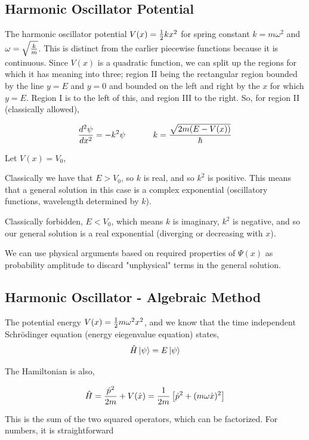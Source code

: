 \documentclass[english, 11pt]{article}
\begin{document}
    \subsection{Harmonic Oscillator Potential}

      The harmonic oscillator potential $V(x) = \frac{1}{2}kx^2$ for spring constant $k = m\omega^2$ and $\omega = \sqrt{\frac{k}{m}}$. This is distinct from the earlier piecewise functions because it is continuous. Since $V(x)$ is a quadratic function, we can split up the regions for which it has meaning into three; region II being the rectangular region bounded by the line $y = E$ and $y = 0$ and bounded on the left and right by the $x$ for which $y = E$. Region I is to the left of this, and region III to the right. So, for region II (classically allowed),

      \[ \f{d^2\psi}{dx^2} = -k^2\psi \ \ \ \ \ \ \ \ \ \ k = \f{\sqrt{2m(E-V(x))}}{\hbar} \]

      Let $V(x) = V_0$,\newline

      Classically we have that $E > V_0$, so $k$ is real, and so $k^2$ is positive. This means that a general solution in this case is a complex exponential (oscillatory functions, wavelength determined by $k$).
      \newline

      Classically forbidden, $E<V_0$, which means $k$ is imaginary, $k^2$ is negative, and so our general solution is a real exponential (diverging or decreasing with $x$).\newline

      We can use physical arguments based on required properties of $\Psi(x)$ as probability amplitude to discard "unphysical" terms in the general solution.

    \subsection{Harmonic Oscillator - Algebraic Method}

      The potential energy $V(x) = \frac{1}{2}m \omega^2 x^2$, and we know that the time independent Schrödinger equation (energy eiegenvalue equation) states,
      \[ \hat{H}\left|\psi\right\rangle = E\left|\psi\right\rangle \]

      The Hamiltonian is also,

      \[ \hat{H} = \frac{\hat{p}^2}{2m} + V(\hat{x}) = \frac{1}{2m} \left[ \hat{p}^2 + (m \omega \hat{x})^2 \right] \]

      This is the sum of the two squared operators, which can be factorized. For numbers, it is straightforward
\end{document}
